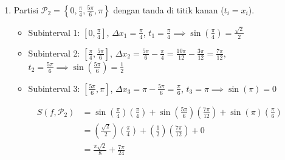 \documentclass[11pt,letterpaper]{article}
\begin{document}
\begin{enumerate}
\begin{enumerate}[label=\alph*)]
          \item Partisi $\mathcal{P}_2 = \left\{0, \frac{\pi}{4}, \frac{5\pi}{6}, \pi\right\}$ dengan tanda di titik kanan ($t_i = x_i$).
                \begin{itemize}
                  \item Subinterval 1: $\left[0, \frac{\pi}{4}\right]$, $\Delta x_1 = \frac{\pi}{4}$, $t_1 = \frac{\pi}{4} \implies \sin\left(\frac{\pi}{4}\right) = \frac{\sqrt{2}}{2}$
                  \item Subinterval 2: $\left[\frac{\pi}{4}, \frac{5\pi}{6}\right]$, $\Delta x_2 = \frac{5\pi}{6} - \frac{\pi}{4} = \frac{10\pi}{12} - \frac{3\pi}{12} = \frac{7\pi}{12}$, $t_2 = \frac{5\pi}{6} \implies \sin\left(\frac{5\pi}{6}\right) = \frac{1}{2}$
                  \item Subinterval 3: $\left[\frac{5\pi}{6}, \pi\right]$, $\Delta x_3 = \pi - \frac{5\pi}{6} = \frac{\pi}{6}$, $t_3 = \pi \implies \sin(\pi) = 0$
                \end{itemize}
                \begin{align*}
                  S(f, \mathcal{P}_2) & = \sin\left(\frac{\pi}{4}\right)\left(\frac{\pi}{4}\right) + \sin\left(\frac{5\pi}{6}\right)\left(\frac{7\pi}{12}\right) + \sin(\pi)\left(\frac{\pi}{6}\right) \\
                                      & = \left(\frac{\sqrt{2}}{2}\right)\left(\frac{\pi}{4}\right) + \left(\frac{1}{2}\right)\left(\frac{7\pi}{12}\right) + 0                                         \\
                                      & = \frac{\pi\sqrt{2}}{8} + \frac{7\pi}{24}
                \end{align*}


\end{enumerate}
\end{enumerate}
\end{document}
